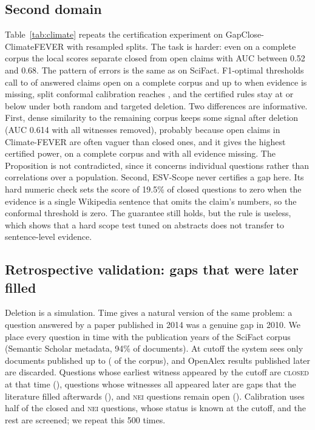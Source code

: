 \documentclass[conference,a4paper]{IEEEtran}
\theoremstyle{definition}
\newcommand{\closed}{\textup{\textsc{closed}}}
\begin{document}
\subsection{Second domain}
Table~\ref{tab:climate} repeats the certification experiment on GapClose-ClimateFEVER with resampled splits. The task is harder: even on a complete corpus the local scores separate closed from open claims with AUC between 0.52 and 0.68. The pattern of errors is the same as on SciFact. F1-optimal thresholds call \ClimFoneZeroMin{} to \ClimFoneZeroMax{} of answered claims open on a complete corpus and up to \ClimFoneMax{} when evidence is missing, split conformal calibration reaches \ClimConfMax{}, and the certified rules stay at or below \ClimCertMax{} under both random and targeted deletion. Two differences are informative. First, dense similarity to the remaining corpus keeps some signal after deletion (AUC 0.614 with all witnesses removed), probably because open claims in Climate-FEVER are often vaguer than closed ones, and it gives the highest certified power, \ClimDensePowZero{} on a complete corpus and \ClimDensePowOne{} with all evidence missing. The Proposition is not contradicted, since it concerns individual questions rather than correlations over a population. Second, ESV-Scope never certifies a gap here. Its hard numeric check sets the score of 19.5\% of closed questions to zero when the evidence is a single Wikipedia sentence that omits the claim's numbers, so the conformal threshold is zero. The guarantee still holds, but the rule is useless, which shows that a hard scope test tuned on abstracts does not transfer to sentence-level evidence.

\begin{table}[t]
\centering
\caption{GapClose-ClimateFEVER, resampled splits, target 0.10. ``Certified'' is the largest mean false novelty of in-situ and transfer rules over all rates, under random and targeted deletion. Power uses transfer calibration.}
\label{tab:climate}

\end{table}

\subsection{Retrospective validation: gaps that were later filled}
Deletion is a simulation. Time gives a natural version of the same problem: a question answered by a paper published in 2014 was a genuine gap in 2010. We place every question in time with the publication years of the SciFact corpus (Semantic Scholar metadata, 94\% of documents). At cutoff \RetroY{} the system sees only documents published up to \RetroY{} (\RetroVisible{} of the corpus), and OpenAlex results published later are discarded. Questions whose earliest witness appeared by the cutoff are \closed{} at that time (\RetroNclosed{}), questions whose witnesses all appeared later are gaps that the literature filled afterwards (\RetroNfilled{}), and \textsc{nei} questions remain open (\RetroNnei{}). Calibration uses half of the closed and \textsc{nei} questions, whose status is known at the cutoff, and the rest are screened; we repeat this 500 times.
\end{document}

